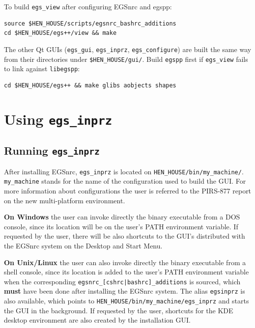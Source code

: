 \documentclass[12pt,twoside]{article}   %
\begin{document}
To build {\tt egs\_view} after configuring EGSnrc and egspp:

\begin{verbatim}
source $HEN_HOUSE/scripts/egsnrc_bashrc_additions
cd $HEN_HOUSE/egs++/view && make
\end{verbatim}

The other Qt GUIs ({\tt egs\_gui}, {\tt egs\_inprz}, {\tt egs\_configure}) are
built the same way from their directories under {\tt \$HEN\_HOUSE/gui/}.
Build {\tt egspp} first if {\tt egs\_view} fails to link against {\tt libegspp}:

\begin{verbatim}
cd $HEN_HOUSE/egs++ && make glibs aobjects shapes
\end{verbatim}

\newpage
\section{Using {\tt egs\_inprz}}
\subsection{Running {\tt egs\_inprz}}

After installing EGSnrc, {\tt egs\_inprz} is located on {\tt HEN\_HOUSE/bin/my\_machine/}.
{\tt my\_machine} stands for the name of the configuration used to build the GUI. For more
information about configurations the user is referred to the PIRS-877 report on the new
multi-platform environment\cite{Ka03}.

{\bf On Windows} the user can invoke directly the binary executable from a DOS console, since its
location will be on the user's PATH environment variable. If requested by the user, there will
be also shortcuts to the GUI's distributed with the EGSnrc system on the Desktop and
Start Menu.

{\bf On Unix/Linux} the user can also invoke directly the binary executable from a shell console,
since its location is added to the user's PATH environment variable when the corresponding
{\tt egsnrc\_[cshrc|bashrc]\_additions} is sourced, which {\bf must} have been done after
installing the EGSnrc system.
The alias {\tt egsinprz} is
also available, which points to {\tt HEN\_HOUSE/bin/my\_machine/egs\_inprz} and starts the GUI
in the background.
If requested by the user, shortcuts for the KDE desktop environment are also created by the
installation GUI.
\end{document}
